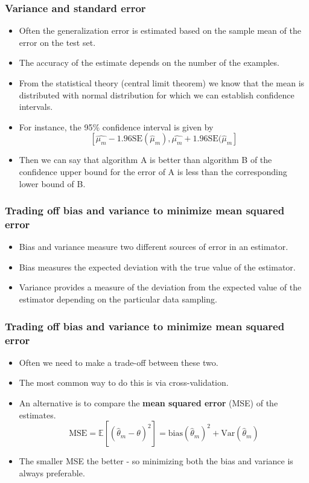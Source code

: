 \documentclass[notes]{beamer}          %
\newcommand{\field}[1]{\mathbb{#1}}
\begin{document}
\begin{frame}
\frametitle{Variance and standard error}
    \begin{itemize}
        \item Often the generalization error is estimated based on the sample mean of the error on the test set.
        \item The accuracy of the estimate depends on the number of the examples.
        \item From the statistical theory (central limit theorem) we know that the mean is distributed with normal distribution for which we can establish confidence intervals.
        \item For instance, the 95\% confidence interval is given by
        $$
        \left [ \hat{\mu_m} - 1.96 \mbox{SE}(\hat{\mu}_m), \hat{\mu_m} + 1.96 \mbox{SE}(\hat{\mu}_m \right ]
        $$
        \item Then we can say that algorithm A is better than algorithm B of the confidence upper bound for the error of A is less than the corresponding lower bound of B.
    \end{itemize}
\end{frame}


\begin{frame}
\frametitle{Trading off bias and variance to minimize  mean squared error}
    \begin{itemize}
        \item Bias and variance measure two different sources of error in an estimator.
        \item Bias measures the expected deviation with the true value of the estimator.
        \item Variance provides a measure of the deviation from the expected value of the estimator depending on the particular data sampling.
    \end{itemize}
\end{frame}


\begin{frame}
\frametitle{Trading off bias and variance to minimize  mean squared error}
    \begin{itemize}
        \item Often we need to make a trade-off between these two.
        \item The most common way to do this is via cross-validation.
        \item An alternative is to compare the {\bf mean squared error} (MSE) of the estimates.
        $$
        \mbox{MSE} = \field{E}[(\hat{\theta}_m -  \theta)^2] = \mbox{bias}(\hat{\theta}_m)^2 + \mbox{Var}(\hat{\theta}_m)
        $$
        \item The smaller MSE the better - so minimizing both the bias and variance is always preferable.

    \end{itemize}
\end{frame}
\end{document}
